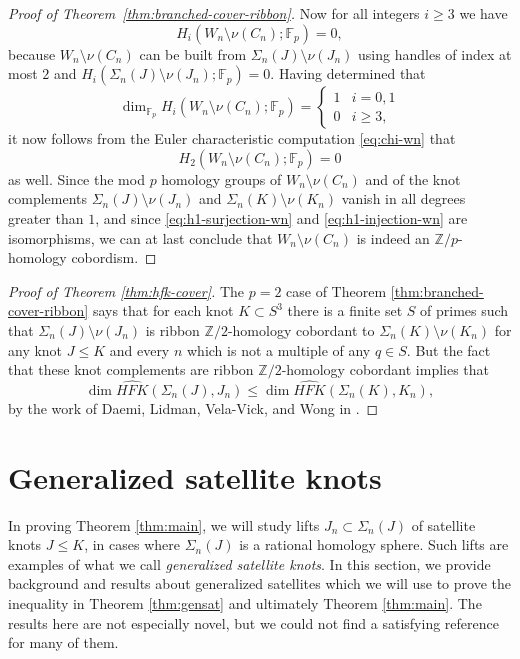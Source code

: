 \documentclass[11pt]{amsart}
\numberwithin{equation}{section}
\numberwithin{theorem}{section}
\theoremstyle{definition}
\newcommand{\Z}{\mathbb{Z}}
\newcommand{\F}{\mathbb{F}}
\newcommand\HFK{\widehat{\mathit{HFK}}}
\begin{document}
\begin{proof}[Proof of Theorem~\ref{thm:branched-cover-ribbon}]
Now for all integers $i \geq 3$ we have \[H_i(W_n \setminus \nu(C_n); \F_p) = 0,\] because $W_n \setminus \nu(C_n)$ can be built from $\Sigma_n(J) \setminus \nu(J_n)$ using handles of index at most $2$ and $H_i(\Sigma_n(J) \setminus \nu(J_n); \F_p) = 0$.  Having determined that
\[ \dim_{\F_p} H_i(W_n \setminus \nu(C_n); \F_p) = \begin{cases} 1 & i=0,1 \\ 0 & i \geq 3, \end{cases} \]
it now follows from the Euler characteristic computation \eqref{eq:chi-wn} that
\[ H_2(W_n \setminus \nu(C_n); \F_p) = 0 \]
as well.  Since the mod $p$ homology groups of $W_n \setminus \nu(C_n)$ and of the knot complements $\Sigma_n(J) \setminus \nu(J_n)$ and $\Sigma_n(K) \setminus \nu(K_n)$ vanish in all degrees greater than $1$, and since \eqref{eq:h1-surjection-wn} and \eqref{eq:h1-injection-wn} are isomorphisms, we can at last conclude that $W_n \setminus \nu(C_n)$ is indeed an $\Z/p$-homology cobordism.
\end{proof}



\begin{proof}[Proof of Theorem \ref{thm:hfk-cover}]
The $p=2$ case of Theorem \ref{thm:branched-cover-ribbon} says that for each knot $K\subset S^3$ there is a finite set $S$ of primes such that $\Sigma_n(J)\setminus \nu(J_n)$ is ribbon $\Z/2$-homology cobordant to $\Sigma_n(K)\setminus \nu(K_n)$ for any knot $J\leq K$ and every  $n$ which is not  a multiple of any $q\in S$. But the fact that these knot complements are ribbon $\Z/2$-homology cobordant implies that \[\dim \HFK(\Sigma_n(J),J_n) \leq \dim\HFK(\Sigma_n(K), K_n),\] by the work of Daemi, Lidman, Vela-Vick, and Wong in \cite[Corollary~4.13]{dlvvw}.\end{proof}
 
 
\section{Generalized satellite knots}
\label{sec:generalized-satellite}

In proving Theorem \ref{thm:main}, we will study lifts $J_n\subset \Sigma_n(J)$ of satellite  knots $J\leq K$, in cases where $\Sigma_n(J)$ is a rational homology sphere. Such lifts are examples of what we call \emph{generalized satellite knots}. In this section, we provide background and  results about generalized satellites which we will use to prove the inequality in Theorem \ref{thm:gensat} and ultimately Theorem \ref{thm:main}. The results here are not especially novel, but we could not find a satisfying reference for many of them.
\end{document}
